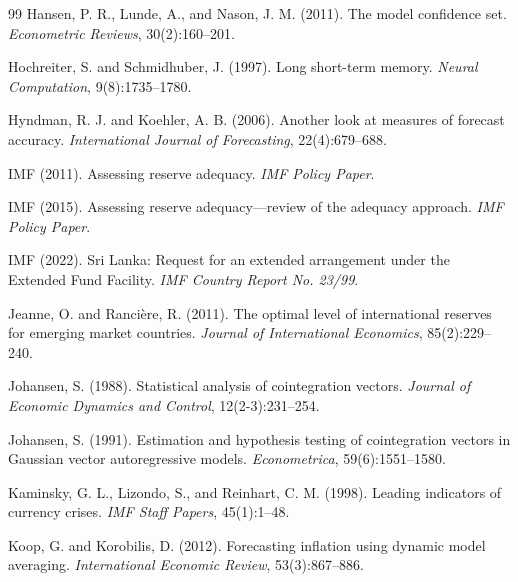 \documentclass[12pt,a4paper]{article}
\begin{document}
\begin{thebibliography}{99}
Hansen, P. R., Lunde, A., and Nason, J. M. (2011).
\newblock The model confidence set.
\newblock \textit{Econometric Reviews}, 30(2):160--201.

Hochreiter, S. and Schmidhuber, J. (1997).
\newblock Long short-term memory.
\newblock \textit{Neural Computation}, 9(8):1735--1780.

Hyndman, R. J. and Koehler, A. B. (2006).
\newblock Another look at measures of forecast accuracy.
\newblock \textit{International Journal of Forecasting}, 22(4):679--688.

IMF (2011).
\newblock Assessing reserve adequacy.
\newblock \textit{IMF Policy Paper}.

IMF (2015).
\newblock Assessing reserve adequacy---review of the adequacy approach.
\newblock \textit{IMF Policy Paper}.

IMF (2022).
\newblock Sri Lanka: Request for an extended arrangement under the Extended Fund Facility.
\newblock \textit{IMF Country Report No. 23/99}.

Jeanne, O. and Ranci\`{e}re, R. (2011).
\newblock The optimal level of international reserves for emerging market countries.
\newblock \textit{Journal of International Economics}, 85(2):229--240.

Johansen, S. (1988).
\newblock Statistical analysis of cointegration vectors.
\newblock \textit{Journal of Economic Dynamics and Control}, 12(2-3):231--254.

Johansen, S. (1991).
\newblock Estimation and hypothesis testing of cointegration vectors in Gaussian vector autoregressive models.
\newblock \textit{Econometrica}, 59(6):1551--1580.

Kaminsky, G. L., Lizondo, S., and Reinhart, C. M. (1998).
\newblock Leading indicators of currency crises.
\newblock \textit{IMF Staff Papers}, 45(1):1--48.

Koop, G. and Korobilis, D. (2012).
\newblock Forecasting inflation using dynamic model averaging.
\newblock \textit{International Economic Review}, 53(3):867--886.


\end{thebibliography}
\end{document}
